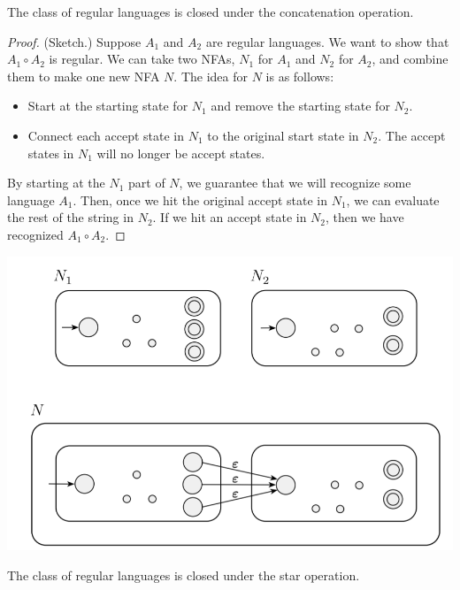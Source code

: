 \documentclass[letterpaper]{article}
\begin{document}
\begin{theorem}{}{}
    The class of regular languages is closed under the concatenation operation.
\end{theorem}

\begin{mdframed}[]
    \begin{proof}
        (Sketch.) Suppose $A_1$ and $A_2$ are regular languages. We want to show that $A_1 \circ A_2$ is regular. We can take two NFAs, $N_1$ for $A_1$ and $N_2$ for $A_2$, and combine them to make one new NFA $N$. The idea for $N$ is as follows: 
        \begin{itemize}
            \item Start at the starting state for $N_1$ and remove the starting state for $N_2$. 
            \item Connect each accept state in $N_1$ to the original start state in $N_2$. The accept states in $N_1$ will no longer be accept states.  
        \end{itemize}
        By starting at the $N_1$ part of $N$, we guarantee that we will recognize some language $A_1$. Then, once we hit the original accept state in $N_1$, we can evaluate the rest of the string in $N_2$. If we hit an accept state in $N_2$, then we have recognized $A_1 \circ A_2$. 
    \end{proof}    
\end{mdframed}

\begin{center}
    \includegraphics[scale=0.5]{../assets/concat_nfa.png}
\end{center}


\begin{theorem}{}{}
    The class of regular languages is closed under the star operation.
\end{theorem}
\end{document}
